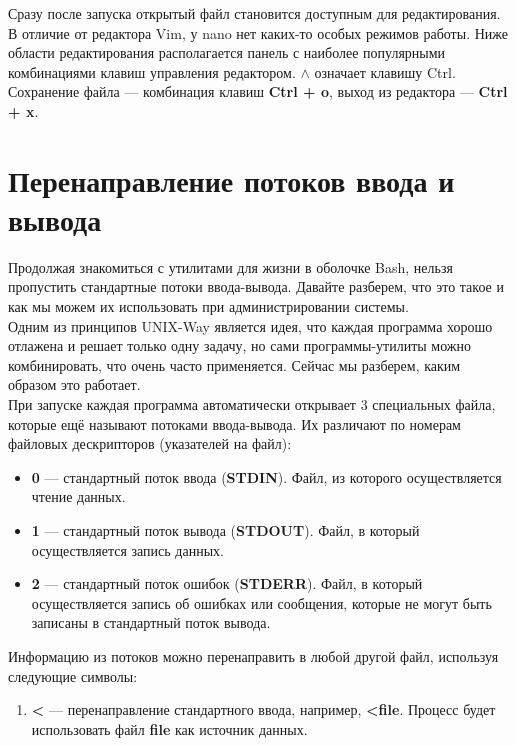 \documentclass[14pt, a4paper]{article}
\begin{document}
Сразу после запуска открытый файл становится доступным для редактирования. В отличие от
редактора Vim, у nano нет каких-то особых режимов работы. Ниже области редактирования
располагается панель с наиболее популярными комбинациями клавиш управления редактором.
$\mathtt{\wedge}$ означает клавишу Ctrl. Сохранение файла — комбинация клавиш \textbf{Ctrl + o}, выход из редактора — \textbf{Ctrl
+ x}.

\section*{Перенаправление потоков ввода и вывода} 

Продолжая знакомиться с утилитами для жизни в оболочке Bash, нельзя пропустить стандартные
потоки ввода-вывода. Давайте разберем, что это такое и как мы можем их использовать при
администрировании системы.\\

Одним из принципов UNIX-Way является идея, что каждая программа хорошо отлажена и решает
только одну задачу, но сами программы-утилиты можно комбинировать, что очень часто применяется.
Сейчас мы разберем, каким образом это работает.\\

При запуске каждая программа автоматически открывает 3 специальных файла, которые ещё
называют потоками ввода-вывода. Их различают по номерам файловых дескрипторов (указателей на
файл):

\begin{itemize}
    \item \textbf{0} — стандартный поток ввода (\textbf{STDIN}). Файл, из которого осуществляется чтение данных.
    \item \textbf{1} — стандартный поток вывода (\textbf{STDOUT}). Файл, в который осуществляется запись данных.
    \item \textbf{2} — стандартный поток ошибок (\textbf{STDERR}). Файл, в который осуществляется запись об
    ошибках или сообщения, которые не могут быть записаны в стандартный поток вывода.
\end{itemize}

Информацию из потоков можно перенаправить в любой другой файл, используя следующие символы:

\begin{enumerate}
    \item \textbf{<} — перенаправление стандартного ввода, например, \textbf{<file}. Процесс будет использовать файл
    \textbf{file} как источник данных.
\end{enumerate}
\end{document}
